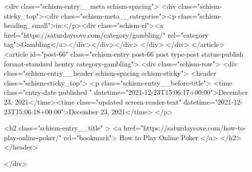 {		<div class="schism-entry__meta schism-spacing">			<div class="schism-sticky_top"><div class="schism-meta__categories"><p class="schism-heading_small">in:</p><div class="schism-cl"><a href="https://saturdaycove.com/category/gambling/" rel="category tag">Gambling</a></div></div></div>		</div>
	</div>
</article>
<article id="post-66" class="schism-entry post-66 post type-post status-publish format-standard hentry category-gambling">
	<div class="schism-row">		<div class="schism-entry__header schism-spacing schism-sticky">			<header class="schism-sticky_top">				<p class="schism-entry__before-title">
					<time class="entry-date published " datetime="2021-12-23T15:06:17+00:00">December 23, 2021</time><time class="updated screen-reader-text" datetime="2021-12-23T15:06:18+00:00">December 23, 2021</time>				</p>

				<h2 class="schism-entry__title" >
					<a href="https://saturdaycove.com/how-to-play-online-poker/" rel="bookmark">
						How to Play Online Poker					</a>
				</h2>
			</header>

					</div>

}
